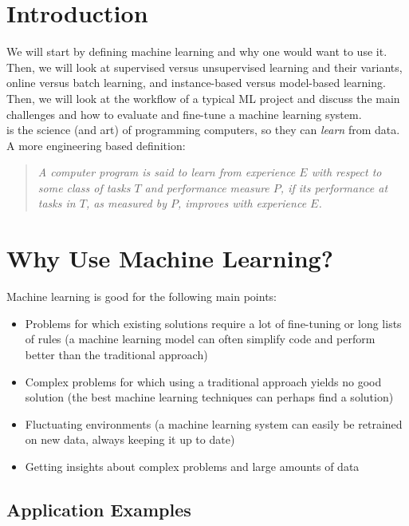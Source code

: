 \section{Introduction}
\label{sec:intro}

We will start by defining machine learning and why one would want to use it. Then, we will look at supervised versus unsupervised learning and their variants, online versus batch learning, and instance-based versus model-based learning. Then, we will look at the workflow of a typical ML project and discuss the main challenges and how to evaluate and fine-tune a machine learning system. \\

 is the science (and art) of programming computers, so they can \textit{learn} from data. \\

A more engineering based definition:
\begin{quote}
    \textit{A computer program is said to learn from experience $E$ with respect to some class of tasks $T$ and performance measure $P$, if its performance at tasks in $T$, as measured by $P$, improves with experience $E$.} \\
\end{quote}

\section{Why Use Machine Learning?}
\label{sec:why_use_ml}

Machine learning is good for the following main points:
\begin{itemize}
    \item Problems for which existing solutions require a lot of fine-tuning or long lists of rules (a machine learning model can often simplify code and perform better than the traditional approach)
    \item Complex problems for which using a traditional approach yields no good solution (the best machine learning techniques can perhaps find a solution)
    \item Fluctuating environments (a machine learning system can easily be retrained on new data, always keeping it up to date)
    \item Getting insights about complex problems and large amounts of data
\end{itemize}

\subsection{Application Examples}
\label{subsec:application_examples}

